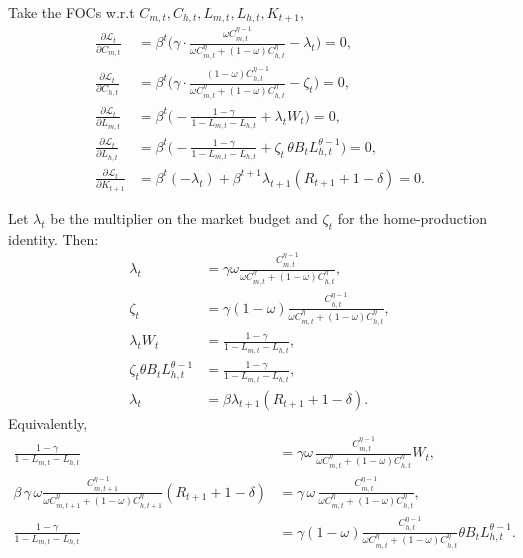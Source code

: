 \documentclass[a4paper,12pt]{article} %
\theoremstyle{nonitalic}
\begin{document}
Take the FOCs w.r.t $C_{m,t},C_{h,t},L_{m,t},L_{h,t},K_{t+1}$,
\begin{align}
\frac{\partial \mathcal{L}_t}{\partial C_{m,t}} &= \beta^t\Big(\gamma\cdot \frac{\omega C_{m,t}^{\eta-1}}{\omega C_{m,t}^{\eta}+(1-\omega)C_{h,t}^{\eta}} - \lambda_t\Big)=0,\\
\frac{\partial \mathcal{L}_t}{\partial C_{h,t}} &= \beta^t\Big(\gamma\cdot \frac{(1-\omega) C_{h,t}^{\eta-1}}{\omega C_{m,t}^{\eta}+(1-\omega)C_{h,t}^{\eta}} - \zeta_t\Big)=0,\\
\frac{\partial \mathcal{L}_t}{\partial L_{m,t}} &= \beta^t\Big(-\frac{1-\gamma}{1-L_{m,t}-L_{h,t}} + \lambda_t W_t\Big)=0,\\
\frac{\partial \mathcal{L}_t}{\partial L_{h,t}} &= \beta^t\Big(-\frac{1-\gamma}{1-L_{m,t}-L_{h,t}} + \zeta_t\,\theta B_t L_{h,t}^{\theta-1}\Big)=0,\\
\frac{\partial \mathcal{L}_t}{\partial K_{t+1}} &= \beta^t(-\lambda_t) + \beta^{t+1}\lambda_{t+1}(R_{t+1}+1-\delta)=0.
\end{align}

Let $\lambda_t$ be the multiplier on the market budget and $\zeta_t$ for the home-production identity. Then:
\begin{align}
\lambda_t &= \gamma \omega \frac{C_{m,t}^{\eta-1}}{\omega C_{m,t}^{\eta}+(1-\omega)C_{h,t}^{\eta}},\\
\zeta_t &= \gamma (1-\omega) \frac{C_{h,t}^{\eta-1}}{\omega C_{m,t}^{\eta}+(1-\omega)C_{h,t}^{\eta}},\\
\lambda_t W_t &= \frac{1-\gamma}{1-L_{m,t}-L_{h,t}},\\
\zeta_t \theta B_t L_{h,t}^{\theta-1} &= \frac{1-\gamma}{1-L_{m,t}-L_{h,t}},\\
\lambda_t &= \beta \lambda_{t+1}(R_{t+1}+1-\delta).
\end{align}
Equivalently,
\begin{align}
\frac{1-\gamma}{1-L_{m,t}-L_{h,t}} 
&= \gamma \omega\, \frac{C_{m,t}^{\eta-1}}{\omega C_{m,t}^{\eta} + (1-\omega)C_{h,t}^{\eta}} W_t,\\
\beta\,\gamma\, \omega \frac{C_{m,t+1}^{\eta-1}}{\omega C_{m,t+1}^{\eta}+(1-\omega)C_{h,t+1}^{\eta}}(R_{t+1}+1-\delta)
&= \gamma\,\omega\, \frac{C_{m,t}^{\eta-1}}{\omega C_{m,t}^{\eta}+(1-\omega)C_{h,t}^{\eta}},\\
\frac{1-\gamma}{1-L_{m,t}-L_{h,t}}
&= \gamma (1-\omega) \frac{C_{h,t}^{\eta-1}}{\omega C_{m,t}^{\eta}+(1-\omega)C_{h,t}^{\eta}} \theta B_t L_{h,t}^{\theta-1}.
\end{align}
\end{document}
